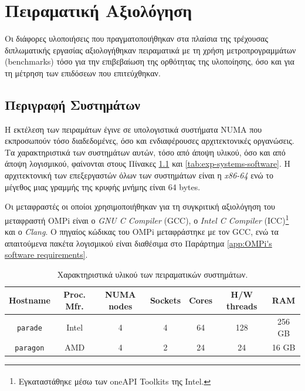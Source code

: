\chapter{Πειραματική Αξιολόγηση}
\label{ch:Experimental Evaluation}
Οι διάφορες υλοποιήσεις που πραγματοποιήθηκαν στα πλαίσια της τρέχουσας διπλωματικής εργασίας αξιολογήθηκαν πειραματικά με τη χρήση μετροπρογραμμάτων (benchmarks) τόσο για την επιβεβαίωση της ορθότητας της υλοποίησης, όσο και για τη μέτρηση των επιδόσεων που επιτεύχθηκαν.


\section{Περιγραφή Συστημάτων}
\label{sec:Systems Description}
Η εκτέλεση των πειραμάτων έγινε σε υπολογιστικά συστήματα NUMA που εκπροσωπούν τόσο διαδεδομένες, όσο και ενδιαφέρουσες αρχιτεκτονικές οργανώσεις. Τα χαρακτηριστικά των συστημάτων αυτών, τόσο από άποψη υλικού, όσο και από άποψη λογισμικού, φαίνονται στους Πίνακες \ref{tab:exp-systems-hardware} και \ref{tab:exp-systems-software}. Η αρχιτεκτονική των επεξεργαστών όλων των συστημάτων είναι η \textit{x86-64} ενώ το μέγεθος μιας γραμμής της κρυφής μνήμης είναι 64 bytes.

Οι μεταφραστές οι οποίοι χρησιμοποιήθηκαν για τη συγκριτική αξιολόγηση του μεταφραστή OMPi είναι ο \textit{GNU C Compiler} (GCC), ο \textit{Intel C Compiler} (ICC)\footnote{Εγκαταστάθηκε μέσω των oneAPI Toolkits της Intel\textsuperscript{\textregistered}.} και ο \textit{Clang}. Ο πηγαίος κώδικας του OMPi μεταφράστηκε με τον GCC, ενώ τα απαιτούμενα πακέτα λογισμικού είναι διαθέσιμα στο Παράρτημα \ref{app:OMPi's software requirements}.

\begin{table}
	\centering
		\begin{tabular}{|c||c|c|c|c|c|c|}
		\hline
		Hostname & Proc. Mfr. & NUMA nodes & Sockets & Cores & H/W threads & RAM \\
		\hline \hline
		\texttt{parade} & Intel & 4 & 4 & 64 & 128 & 256 GB \\
		\hline
		\texttt{paragon} & AMD  & 4 & 2 & 24 & 24 & 16 GB \\
		\hline
		\end{tabular}
		\caption{Χαρακτηριστικά υλικού των πειραματικών συστημάτων.}
		\label{tab:exp-systems-hardware}
\end{table}

